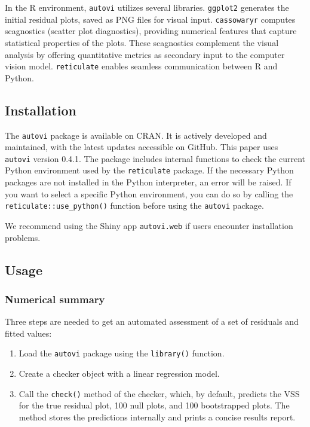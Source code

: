 \documentclass[
doublespace,
  times]{anzsauth}
\providecommand{\tightlist}{%
  \setlength{\itemsep}{0pt}\setlength{\parskip}{0pt}}\usepackage{longtable,booktabs,array}
\begin{document}
In the R environment, \texttt{autovi} utilizes several libraries.
\texttt{ggplot2} \citep{ggplot2} generates the initial residual plots,
saved as PNG files for visual input. \texttt{cassowaryr}
\citep{mason2022cassowaryr} computes scagnostics (scatter plot
diagnostics), providing numerical features that capture statistical
properties of the plots. These scagnostics complement the visual
analysis by offering quantitative metrics as secondary input to the
computer vision model. \texttt{reticulate} \citep{reticulate} enables
seamless communication between R and Python.

\subsection{Installation}\label{installation}

The \texttt{autovi} package is available on CRAN. It is actively
developed and maintained, with the latest updates accessible on GitHub.
This paper uses \texttt{autovi} version 0.4.1. The package includes
internal functions to check the current Python environment used by the
\texttt{reticulate} package. If the necessary Python packages are not
installed in the Python interpreter, an error will be raised. If you
want to select a specific Python environment, you can do so by calling
the \texttt{reticulate::use\_python()} function before using the
\texttt{autovi} package.

We recommend using the Shiny app \texttt{autovi.web} if users encounter
installation problems.

\subsection{Usage}\label{sec-autovi-usage}

\subsubsection{Numerical summary}\label{sec-autovi-numerical}

Three steps are needed to get an automated assessment of a set of
residuals and fitted values:

\begin{enumerate}
\def\labelenumi{\arabic{enumi}.}
\tightlist
\item
  Load the \texttt{autovi} package using the \texttt{library()}
  function.
\item
  Create a checker object with a linear regression model.
\item
  Call the \texttt{check()} method of the checker, which, by default,
  predicts the VSS for the true residual plot, 100 null plots, and 100
  bootstrapped plots. The method stores the predictions internally and
  prints a concise results report.
\end{enumerate}
\end{document}
